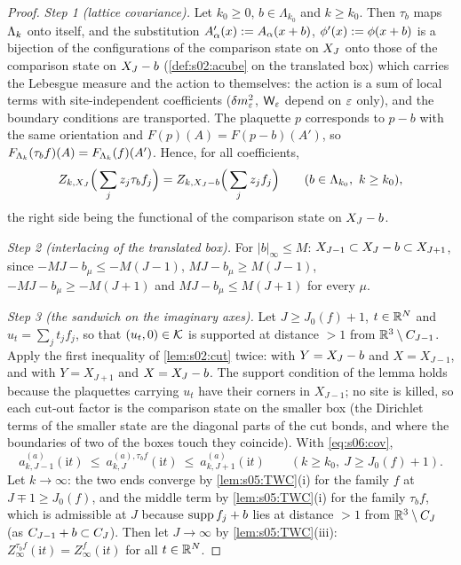 \begin{proof}
\emph{Step 1 (lattice covariance).} Let $k_0\ge0$, $b\in\Lambda_{k_0}$ and $k\ge k_0$. Then $\tau_b$ maps $\Lambda_k$ onto itself, and the substitution $A'_\alpha(x):= A_\alpha(x+b)$, $\phi'(x):=\phi(x+b)$ is a bijection of the configurations of the comparison state on $X_J$ onto those of the comparison state on $X_J-b$ (\cref{def:s02:acube} on the translated box) which carries the Lebesgue measure and the action to themselves: the action is a sum of local terms with site-independent coefficients ($\delta m^2_{\varepsilon}$, $\mathsf W_{\varepsilon}$ depend on $\varepsilon$ only), and the boundary conditions are transported. The plaquette $p$ corresponds to $p-b$ with the same orientation and $F(p)(A)=F(p-b)(A')$, so $F_{\Lambda_k}(\tau_bf)(A)=F_{\Lambda_k}(f)(A')$. Hence, for all coefficients,
\begin{equation}\label{eq:s06:cov}
Z_{k,\XJ}\Big(\sum_jz_j\tau_bf_j\Big)=Z_{k,\XJ-b}\Big(\sum_jz_jf_j\Big)\qquad(b\in\Lambda_{k_0},\ k\ge k_0),
\end{equation}
the right side being the functional of the comparison state on $X_J-b$.

\emph{Step 2 (interlacing of the translated box).} For $|b|_\infty\le M$: $X_{J-1}\subset X_J-b\subset X_{J+1}$, since $-MJ-b_\mu\le-M(J-1)$, $MJ-b_\mu\ge M(J-1)$, $-MJ-b_\mu\ge-M(J+1)$ and $MJ-b_\mu\le M(J+1)$ for every $\mu$.

\emph{Step 3 (the sandwich on the imaginary axes).} Let $J\ge J_0(f)+1$, $t\in\mathbb R^N$ and $u_t=\sum_jt_jf_j$, so that $(u_t,0)\in\mathcal K$ is supported at distance $>1$ from $\mathbb R^3\setminus C_{J-1}$. Apply the first inequality of \cref{lem:s02:cut} twice: with $Y=X_J-b$ and $X=X_{J-1}$, and with $Y=X_{J+1}$ and $X=X_J-b$. The support condition of the lemma holds because the plaquettes carrying $u_t$ have their corners in $X_{J-1}$; no site is killed, so each cut-out factor is the comparison state on the smaller box (the Dirichlet terms of the smaller state are the diagonal parts of the cut bonds, and where the boundaries of two of the boxes touch they coincide). With \eqref{eq:s06:cov},
\[
a^{(a)}_{k,J-1}(\mathrm it)\ \le\ a^{(a),\tau_bf}_{k,J}(\mathrm it)\ \le\ a^{(a)}_{k,J+1}(\mathrm it)\qquad(k\ge k_0,\ J\ge J_0(f)+1).
\]
Let $k\to\infty$: the two ends converge by \cref{lem:s05:TWC}(i) for the family $f$ at $J\mp1\ge J_0(f)$, and the middle term by \cref{lem:s05:TWC}(i) for the family $\tau_bf$, which is admissible at $J$ because $\operatorname{supp} f_j+b$ lies at distance $>1$ from $\mathbb R^3\setminus C_J$ (as $C_{J-1}+b\subset C_J$). Then let $J\to\infty$ by \cref{lem:s05:TWC}(iii): $Z^{\tau_bf}_\infty(\mathrm it)=Z^f_\infty(\mathrm it)$ for all $t\in\mathbb R^N$.


\end{proof}
